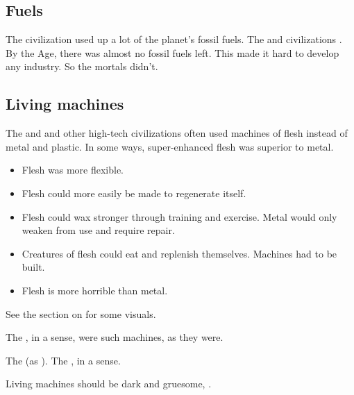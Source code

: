 \subsection{Fuels}
The \ophidian civilization used up a lot of the planet's fossil fuels. 
The \quiljaaran and \aryoth civilizations .
By the \Human Age, there was almost no fossil fuels left.
This made it hard to develop any industry. 
So the mortals didn't. 









\subsection{Living machines}
The \ophidians and \voyagers and other high-tech civilizations often used machines of flesh instead of metal and plastic. 
In some ways, super-enhanced flesh was superior to metal.

\begin{itemize}
  \item Flesh was more flexible.
  \item Flesh could more easily be made to regenerate itself. 
  \item Flesh could wax stronger through training and exercise.
    Metal would only weaken from use and require repair. 
  \item Creatures of flesh could eat and replenish themselves. 
    Machines had to be built.
  \item Flesh is more horrible than metal. 
\end{itemize}

See the section on  for some visuals. 

The \noggyaleth, in a sense, were such machines,  as they were. 

The \dragons {} (as ). 
The , in a sense.

Living machines should be dark and gruesome, . 





